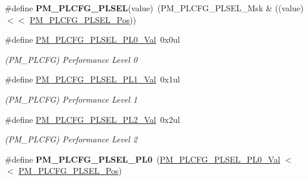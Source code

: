 \begin{DoxyCompactItemize}
\item 
\hypertarget{group___s_a_m_l21___p_m_ga2b81d1dc3db595fd92cba8b1e8f16d26}{}\#define {\bfseries P\+M\+\_\+\+P\+L\+C\+F\+G\+\_\+\+P\+L\+S\+E\+L}(value)~(P\+M\+\_\+\+P\+L\+C\+F\+G\+\_\+\+P\+L\+S\+E\+L\+\_\+\+Msk \& ((value) $<$$<$ \hyperlink{group___s_a_m_l21___p_m_ga693b3d1b5761b829a93e9c14809abea8}{P\+M\+\_\+\+P\+L\+C\+F\+G\+\_\+\+P\+L\+S\+E\+L\+\_\+\+Pos}))\label{group___s_a_m_l21___p_m_ga2b81d1dc3db595fd92cba8b1e8f16d26}

\item 
\hypertarget{group___s_a_m_l21___p_m_gaea4425d16c39ec1bcf45d1a8d091d8a0}{}\#define \hyperlink{group___s_a_m_l21___p_m_gaea4425d16c39ec1bcf45d1a8d091d8a0}{P\+M\+\_\+\+P\+L\+C\+F\+G\+\_\+\+P\+L\+S\+E\+L\+\_\+\+P\+L0\+\_\+\+Val}~0x0ul\label{group___s_a_m_l21___p_m_gaea4425d16c39ec1bcf45d1a8d091d8a0}

\begin{DoxyCompactList}\small\item\em (P\+M\+\_\+\+P\+L\+C\+F\+G) Performance Level 0 \end{DoxyCompactList}\item 
\hypertarget{group___s_a_m_l21___p_m_ga0897f81e64cd9cbea06e3e2a21dfb160}{}\#define \hyperlink{group___s_a_m_l21___p_m_ga0897f81e64cd9cbea06e3e2a21dfb160}{P\+M\+\_\+\+P\+L\+C\+F\+G\+\_\+\+P\+L\+S\+E\+L\+\_\+\+P\+L1\+\_\+\+Val}~0x1ul\label{group___s_a_m_l21___p_m_ga0897f81e64cd9cbea06e3e2a21dfb160}

\begin{DoxyCompactList}\small\item\em (P\+M\+\_\+\+P\+L\+C\+F\+G) Performance Level 1 \end{DoxyCompactList}\item 
\hypertarget{group___s_a_m_l21___p_m_ga0434b913fd9da073c4d090b9196e9752}{}\#define \hyperlink{group___s_a_m_l21___p_m_ga0434b913fd9da073c4d090b9196e9752}{P\+M\+\_\+\+P\+L\+C\+F\+G\+\_\+\+P\+L\+S\+E\+L\+\_\+\+P\+L2\+\_\+\+Val}~0x2ul\label{group___s_a_m_l21___p_m_ga0434b913fd9da073c4d090b9196e9752}

\begin{DoxyCompactList}\small\item\em (P\+M\+\_\+\+P\+L\+C\+F\+G) Performance Level 2 \end{DoxyCompactList}\item 
\hypertarget{group___s_a_m_l21___p_m_ga0eebd1aeac9ecf8878f11a0274c94aa2}{}\#define {\bfseries P\+M\+\_\+\+P\+L\+C\+F\+G\+\_\+\+P\+L\+S\+E\+L\+\_\+\+P\+L0}~(\hyperlink{group___s_a_m_l21___p_m_gaea4425d16c39ec1bcf45d1a8d091d8a0}{P\+M\+\_\+\+P\+L\+C\+F\+G\+\_\+\+P\+L\+S\+E\+L\+\_\+\+P\+L0\+\_\+\+Val}        $<$$<$ \hyperlink{group___s_a_m_l21___p_m_ga693b3d1b5761b829a93e9c14809abea8}{P\+M\+\_\+\+P\+L\+C\+F\+G\+\_\+\+P\+L\+S\+E\+L\+\_\+\+Pos})\label{group___s_a_m_l21___p_m_ga0eebd1aeac9ecf8878f11a0274c94aa2}


\end{DoxyCompactItemize}
